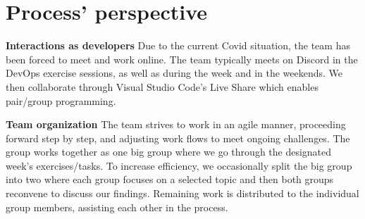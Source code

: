 \section{Process' perspective}

\textbf{Interactions as developers}\newline
  Due to the current Covid situation, the team has been forced to meet and work online. The team typically meets on Discord in the DevOps
  exercise sessions, as well as during the week and in the weekends. We then collaborate through Visual Studio Code's Live Share which enables pair/group programming. 
  \newline
 
\textbf{Team organization}\newline
  The team strives to work in an agile manner, proceeding forward step by step, and adjusting work flows to meet ongoing challenges. The group works together as one big group where we go through the designated week's exercises/tasks. 
  To increase efficiency, we occasionally split the big group into two where each group focuses on a selected topic
  and then both groups reconvene to discuss our findings. Remaining work is distributed to the individual group members, assisting each other in the process.

